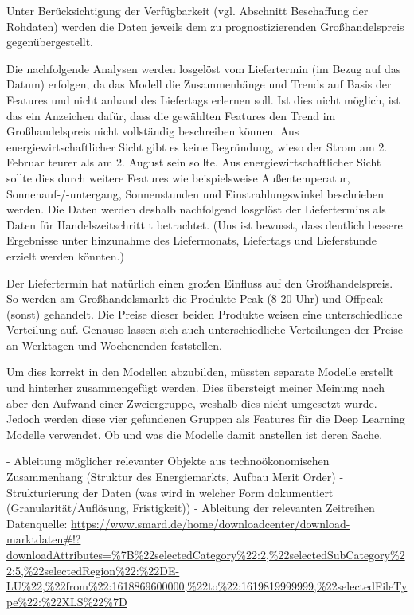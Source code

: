 Unter Berücksichtigung der Verfügbarkeit (vgl. Abschnitt Beschaffung der Rohdaten) werden die Daten jeweils dem zu prognostizierenden Großhandelspreis gegenübergestellt. 

Die nachfolgende Analysen werden losgelöst vom Liefertermin (im Bezug auf das Datum) erfolgen, da das Modell die Zusammenhänge und Trends auf Basis der Features und nicht anhand des Liefertags erlernen soll. Ist dies nicht möglich, ist das ein Anzeichen dafür, dass die gewählten Features den Trend im Großhandelspreis nicht vollständig beschreiben können. Aus energiewirtschaftlicher Sicht gibt es keine Begründung, wieso der Strom am 2. Februar teurer als am 2. August sein sollte. Aus energiewirtschaftlicher Sicht sollte dies durch weitere Features wie beispielsweise Außentemperatur, Sonnenauf-/-untergang, Sonnenstunden und Einstrahlungswinkel beschrieben werden. Die Daten werden deshalb nachfolgend losgelöst der Liefertermins als Daten für Handelszeitschritt t betrachtet. (Uns ist bewusst, dass deutlich bessere Ergebnisse unter hinzunahme des Liefermonats, Liefertags und Lieferstunde erzielt werden könnten.)


Der Liefertermin hat natürlich einen großen Einfluss auf den Großhandelspreis. So werden am Großhandelsmarkt die Produkte Peak (8-20 Uhr) und Offpeak (sonst) gehandelt. Die Preise dieser beiden Produkte weisen eine unterschiedliche Verteilung auf. 
Genauso lassen sich auch unterschiedliche Verteilungen der Preise an Werktagen und Wochenenden feststellen. 

Um dies korrekt in den Modellen abzubilden, müssten separate Modelle erstellt und hinterher zusammengefügt werden. Dies übersteigt meiner Meinung nach aber den Aufwand einer Zweiergruppe, weshalb dies nicht umgesetzt wurde. Jedoch werden diese vier gefundenen Gruppen als Features für die Deep Learning Modelle verwendet. Ob und was die Modelle damit anstellen ist deren Sache.




-	Ableitung möglicher relevanter Objekte aus technoökonomischen Zusammenhang (Struktur des Energiemarkts, Aufbau Merit Order)
-	Strukturierung der Daten (was wird in welcher Form dokumentiert (Granularität/Auflösung, Fristigkeit))
-	Ableitung der relevanten Zeitreihen
Datenquelle: \url{https://www.smard.de/home/downloadcenter/download-marktdaten#!?downloadAttributes=%7B%22selectedCategory%22:2,%22selectedSubCategory%22:5,%22selectedRegion%22:%22DE-LU%22,%22from%22:1618869600000,%22to%22:1619819999999,%22selectedFileType%22:%22XLS%22%7D}
